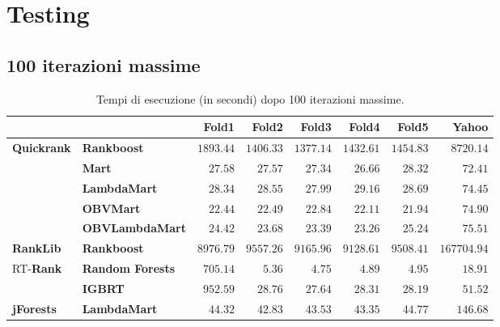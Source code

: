 \chapter*{Testing}

	\section*{100 iterazioni massime}
	
		\begin{table}[!h]
			\centering
			\begin{tabular}{ll|r|r|r|r|r|r|}
				&& \textbf{Fold1} & \textbf{Fold2} & \textbf{Fold3} & \textbf{Fold4} & \textbf{Fold5} & \textbf{Yahoo}\\
				\hline
				\multirow{5}{*}{\textbf{Quickrank}} & \textbf{Rankboost} & $1893.44$ & $1406.33$ & $1377.14$ & $1432.61$ & $1454.83$ & $8720.14$\\
				\cline{2-8}
				& \textbf{Mart} & $27.58$ & $27.57$ & $27.34$ & $26.66$ & $28.32$ & $72.41$\\
				\cline{2-8}
				& \textbf{LambdaMart} & $28.34$ & $28.55$ & $27.99$ & $29.16$ & $28.69$ & $74.45$\\
				\cline{2-8}
				& \textbf{OBVMart} & $22.44$ & $22.49$ & $22.84$ & $22.11$ & $21.94$ & $74.90$\\
				\cline{2-8}
				& \textbf{OBVLambdaMart} & $24.42$ & $23.68$ & $23.39$ & $23.26$ & $25.24$ & $75.51$\\
				\hline
				\textbf{RankLib} & \textbf{Rankboost} & $8976.79$ & $9557.26$ & $9165.96$ & $9128.61$ & $9508.41$ & $167704.94$\\
				\hline
				\multirow{2}{*}{RT-\textbf{Rank}} & \textbf{Random Forests} & $705.14$ & $5.36$ & $4.75$ & $4.89$ & $4.95$ & $18.91$\\
				\cline{2-8}
				& \textbf{IGBRT} & $952.59$ & $28.76$ & $27.64$ & $28.31$ & $28.19$ & $51.52$\\
				\hline
				\textbf{jForests} & \textbf{LambdaMart} & $44.32$ & $42.83$ & $43.53$ & $43.35$ & $44.77$ & $146.68$\\
				\hline
			\end{tabular}
			\caption{Tempi di esecuzione (in secondi) dopo 100 iterazioni massime.}
			\label{fig:time_100}
		\end{table}
		
